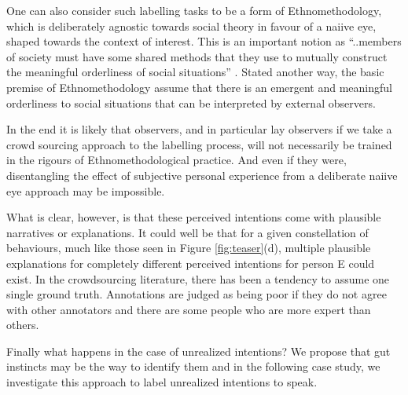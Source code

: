 \documentclass[manuscript,screen,review]{acmart}
\begin{document}
One can also consider such labelling tasks to be a form of Ethnomethodology, which is deliberately agnostic towards social theory in favour of a naiive eye, shaped towards the context of interest. This is an important notion as ``..members of society must have some shared methods that they use to mutually construct the meaningful orderliness of social situations” \cite{Blackwell2003}. Stated another way, the basic premise of Ethnomethodology assume that there is an emergent and meaningful orderliness to social situations that can be interpreted by external observers. 

In the end it is likely that observers, and in particular lay observers if we take a crowd sourcing approach to the labelling process, will not necessarily be trained in the rigours of Ethnomethodological practice. And even if they were, disentangling the effect of subjective personal experience from a deliberate naiive eye approach may be impossible. 

What is clear, however, is that these perceived intentions come with plausible narratives or explanations. It could well be that for a given constellation of behaviours, much like those seen in Figure \ref{fig:teaser}(d), multiple plausible explanations for completely different perceived intentions for person E could exist. In the crowdsourcing literature, there has been a tendency to assume one single ground truth. Annotations are judged as being poor if they do not agree with other annotators and there are some people who are more expert than others\cite{10.1609/aimag.v36i1.2564}. 

Finally what happens in the case of unrealized intentions? We propose that gut instincts may be the way to identify them and in the following case study, we investigate this approach to label unrealized intentions to speak.


\end{document}

